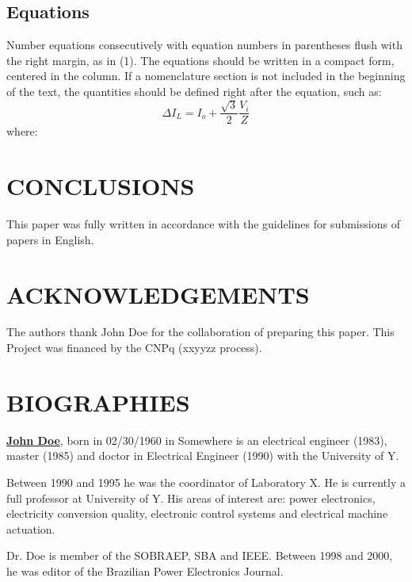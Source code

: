\documentclass[english]{sobraep}
\begin{document}
\subsection{Equations}
Number equations consecutively with equation numbers in parentheses flush with the right margin, as in (1). The equations should be written in a compact form, centered in the column. If a nomenclature section is not included in the beginning of the text, the quantities should be defined right after the equation, such as:
\begin{equation}
	\Delta I_{L}=I_{o}+\frac{\sqrt{3}}{2}\frac{V_{i}}{Z}
\end{equation}
where:





\section{CONCLUSIONS}
This paper was fully written in accordance with the guidelines for submissions of papers in English.


\section*{ACKNOWLEDGEMENTS}
The authors thank John Doe for the collaboration of preparing this paper. This Project was financed by the CNPq (xxyyzz process).





\balance

\section*{BIOGRAPHIES}
\noindent\textbf{\underline{John Doe}}, born in 02/30/1960 in Somewhere is an electrical engineer (1983), master (1985) and doctor in Electrical Engineer (1990) with the University of Y.

Between 1990 and 1995 he was the coordinator of Laboratory X. He is currently a full professor at University of Y. His areas of interest are: power electronics, electricity conversion quality, electronic control systems and electrical machine actuation.

Dr. Doe is member of the SOBRAEP, SBA and IEEE. Between 1998 and 2000, he was editor of the Brazilian \linebreak Power Electronics Journal.
\end{document}
